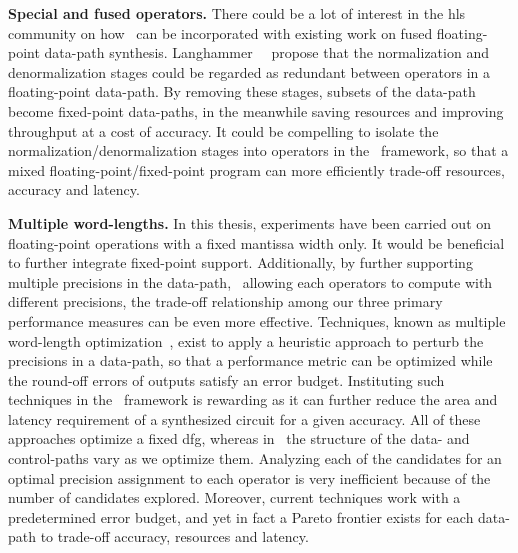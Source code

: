\textbf{Special and fused operators.} There could be a lot of interest in the
\gls{hls} community on how \soap~can be incorporated with existing work on
fused floating-point data-path synthesis.  Langhammer~\etal~\cite{langhammer}
propose that the normalization and denormalization stages could be regarded
as redundant between operators in a floating-point data-path.  By removing
these stages, subsets of the data-path become fixed-point data-paths, in the
meanwhile saving resources and improving throughput at a cost of accuracy.  It
could be compelling to isolate the normalization/denormalization stages into
operators in the \soap~framework, so that a mixed floating-point/fixed-point
program can more efficiently trade-off resources, accuracy and latency.

\textbf{Multiple word-lengths.}  In this thesis, experiments have been carried
out on floating-point operations with a fixed mantissa width only.  It would be
beneficial to further integrate fixed-point support.  Additionally, by further
supporting multiple precisions in the data-path, \ie~allowing each operators
to compute with different precisions, the trade-off relationship among our
three primary performance measures can be even more effective.  Techniques,
known as multiple word-length optimization~\cite{constantinides, lee06,
cantin02}, exist to apply a heuristic approach to perturb the precisions in a
data-path, so that a performance metric can be optimized while the round-off
errors of outputs satisfy an error budget.  Instituting such techniques in the
\soap~framework is rewarding as it can further reduce the area and latency
requirement of a synthesized circuit for a given accuracy.  All of these
approaches optimize a fixed \acrlong{dfg}, whereas in \soap~the structure
of the data- and control-paths vary as we optimize them.  Analyzing each of
the candidates for an optimal precision assignment to each operator is very
inefficient because of the number of candidates explored.  Moreover, current
techniques work with a predetermined error budget, and yet in fact a Pareto
frontier exists for each data-path to trade-off accuracy, resources and
latency.

